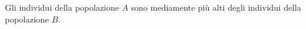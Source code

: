 Gli individui della popolazione $A$ sono mediamente più alti degli 
individui della popolazione $B$. 